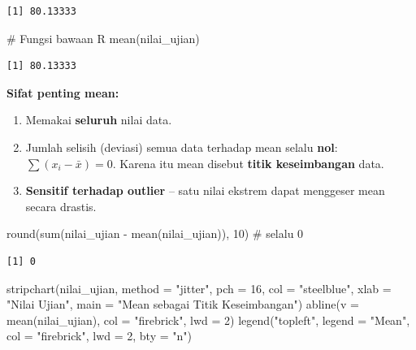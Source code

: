 \documentclass[
  indonesian,
  letterpaper,
]{book}
\newenvironment{Shaded}{\begin{snugshade}}{\end{snugshade}}
\newcommand{\AttributeTok}[1]{\textcolor[rgb]{0.40,0.45,0.13}{#1}}
\newcommand{\CommentTok}[1]{\textcolor[rgb]{0.37,0.37,0.37}{#1}}
\newcommand{\DecValTok}[1]{\textcolor[rgb]{0.68,0.00,0.00}{#1}}
\newcommand{\FunctionTok}[1]{\textcolor[rgb]{0.28,0.35,0.67}{#1}}
\newcommand{\NormalTok}[1]{\textcolor[rgb]{0.00,0.23,0.31}{#1}}
\newcommand{\SpecialCharTok}[1]{\textcolor[rgb]{0.37,0.37,0.37}{#1}}
\newcommand{\StringTok}[1]{\textcolor[rgb]{0.13,0.47,0.30}{#1}}
\providecommand{\tightlist}{%
  \setlength{\itemsep}{0pt}\setlength{\parskip}{0pt}}
\begin{document}
\begin{verbatim}
[1] 80.13333
\end{verbatim}

\begin{Shaded}
\begin{Highlighting}[]
\CommentTok{\# Fungsi bawaan R}
\FunctionTok{mean}\NormalTok{(nilai\_ujian)}
\end{Highlighting}
\end{Shaded}

\begin{verbatim}
[1] 80.13333
\end{verbatim}

\textbf{Sifat penting mean:}

\begin{enumerate}
\def\labelenumi{\arabic{enumi}.}
\tightlist
\item
  Memakai \textbf{seluruh} nilai data.
\item
  Jumlah selisih (deviasi) semua data terhadap mean selalu \textbf{nol}:
  \(\sum (x_i - \bar{x}) = 0\). Karena itu mean disebut \textbf{titik
  keseimbangan} data.
\item
  \textbf{Sensitif terhadap outlier} -- satu nilai ekstrem dapat
  menggeser mean secara drastis.
\end{enumerate}

\begin{Shaded}
\begin{Highlighting}[]
\FunctionTok{round}\NormalTok{(}\FunctionTok{sum}\NormalTok{(nilai\_ujian }\SpecialCharTok{{-}} \FunctionTok{mean}\NormalTok{(nilai\_ujian)), }\DecValTok{10}\NormalTok{)   }\CommentTok{\# selalu 0}
\end{Highlighting}
\end{Shaded}

\begin{verbatim}
[1] 0
\end{verbatim}

\begin{Shaded}
\begin{Highlighting}[]
\FunctionTok{stripchart}\NormalTok{(nilai\_ujian, }\AttributeTok{method =} \StringTok{"jitter"}\NormalTok{, }\AttributeTok{pch =} \DecValTok{16}\NormalTok{, }\AttributeTok{col =} \StringTok{"steelblue"}\NormalTok{,}
\AttributeTok{xlab =} \StringTok{"Nilai Ujian"}\NormalTok{, }\AttributeTok{main =} \StringTok{"Mean sebagai Titik Keseimbangan"}\NormalTok{)}
\FunctionTok{abline}\NormalTok{(}\AttributeTok{v =} \FunctionTok{mean}\NormalTok{(nilai\_ujian), }\AttributeTok{col =} \StringTok{"firebrick"}\NormalTok{, }\AttributeTok{lwd =} \DecValTok{2}\NormalTok{)}
\FunctionTok{legend}\NormalTok{(}\StringTok{"topleft"}\NormalTok{, }\AttributeTok{legend =} \StringTok{"Mean"}\NormalTok{, }\AttributeTok{col =} \StringTok{"firebrick"}\NormalTok{, }\AttributeTok{lwd =} \DecValTok{2}\NormalTok{, }\AttributeTok{bty =} \StringTok{"n"}\NormalTok{)}
\end{Highlighting}
\end{Shaded}
\end{document}
